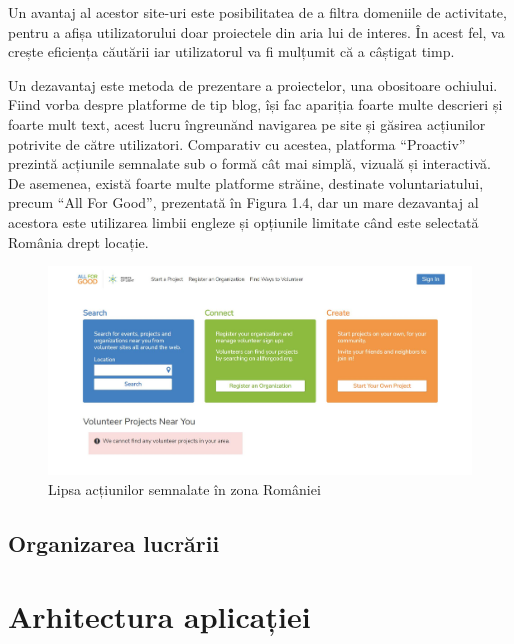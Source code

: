 \documentclass[12pt,a4paper]{report}
\begin{document}
\par
Un avantaj al acestor site-uri este posibilitatea de a filtra domeniile de activitate, pentru a afișa utilizatorului doar proiectele din aria lui de interes. În acest fel, va crește eficiența căutării iar utilizatorul va fi mulțumit că a câștigat timp.
\\\par 
Un dezavantaj este metoda de prezentare a proiectelor, una obositoare ochiului. Fiind vorba despre platforme de tip blog, își fac apariția foarte multe descrieri și foarte mult text, acest lucru îngreunănd navigarea pe site și găsirea acțiunilor potrivite de către utilizatori. Comparativ cu acestea, platforma “Proactiv” prezintă acțiunile semnalate sub o formă cât mai simplă, vizuală și interactivă.
\newpage
De asemenea, există foarte multe platforme străine, destinate voluntariatului, precum “All For Good”\cite{afg}, prezentată în Figura 1.4, dar un mare dezavantaj al acestora este utilizarea limbii engleze și opțiunile limitate când este selectată România drept locație.
\begin{figure}[H]
\centering
  \includegraphics[width=1\linewidth]{./imagini/afg.jpg}
  \caption{Lipsa acțiunilor semnalate în zona României}
\end{figure}

\section{Organizarea lucrării}


\chapter{Arhitectura aplicației}
\end{document}
